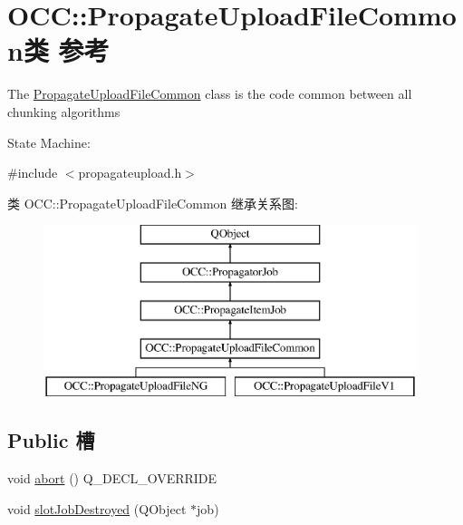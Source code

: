 \hypertarget{class_o_c_c_1_1_propagate_upload_file_common}{}\section{O\+CC\+:\+:Propagate\+Upload\+File\+Common类 参考}
\label{class_o_c_c_1_1_propagate_upload_file_common}


The \hyperlink{class_o_c_c_1_1_propagate_upload_file_common}{Propagate\+Upload\+File\+Common} class is the code common between all chunking algorithms

State Machine\+:  




{\ttfamily \#include $<$propagateupload.\+h$>$}

类 O\+CC\+:\+:Propagate\+Upload\+File\+Common 继承关系图\+:\begin{figure}[H]
\begin{center}
\leavevmode
\includegraphics[height=5.000000cm]{class_o_c_c_1_1_propagate_upload_file_common}
\end{center}
\end{figure}
\subsection*{Public 槽}
\begin{DoxyCompactItemize}
\item 
void \hyperlink{class_o_c_c_1_1_propagate_upload_file_common_a0ee3717cefa23025198d907abe224407}{abort} () Q\+\_\+\+D\+E\+C\+L\+\_\+\+O\+V\+E\+R\+R\+I\+DE
\item 
void \hyperlink{class_o_c_c_1_1_propagate_upload_file_common_a7f4708c023e93387f7815624fd3d9cdd}{slot\+Job\+Destroyed} (Q\+Object $\ast$job)
\end{DoxyCompactItemize}
